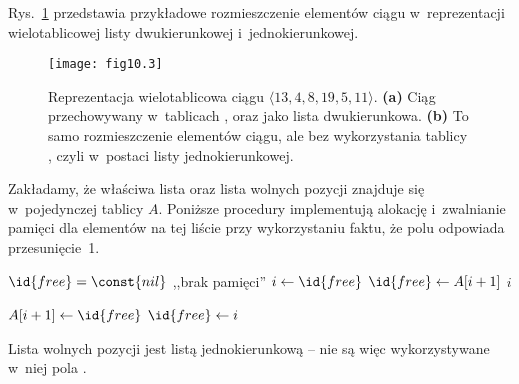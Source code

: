 
\exercise %
Rys.~\ref{fig:10.3-1} przedstawia przykładowe rozmieszczenie elementów ciągu w~reprezentacji wielotablicowej listy dwukierunkowej i~jednokierunkowej.
\begin{figure}[ht]
	\begin{center}
		\texttt{[image: fig10.3]}
	\end{center}
	\caption{Reprezentacja wielotablicowa ciągu $\langle13,4,8,19,5,11\rangle$. {\sffamily\bfseries(a)} Ciąg przechowywany w~tablicach ,  oraz  jako lista dwukierunkowa. {\sffamily\bfseries(b)} To samo rozmieszczenie elementów ciągu, ale bez wykorzystania tablicy , czyli w~postaci listy jednokierunkowej.} \label{fig:10.3-1}
\end{figure}

\exercise %
Zakładamy, że właściwa lista oraz lista wolnych pozycji znajduje się w~pojedynczej tablicy $A$. Poniższe procedury implementują alokację i~zwalnianie pamięci dla elementów na tej liście przy wykorzystaniu faktu, że polu  odpowiada przesunięcie~1.
\begin{codebox}
\li	\If $\id{free}=\const{nil}$
\li		\Then \Error ,,brak pamięci''
		\End
\li	$i\gets\id{free}$
\li	$\id{free}\gets A[i+1]$
\li	\Return $i$
\end{codebox}

\begin{codebox}
\li	$A[i+1]\gets\id{free}$
\li	$\id{free}\gets i$
\end{codebox}

\exercise %
Lista wolnych pozycji jest listą jednokierunkową -- nie są więc wykorzystywane w~niej pola .

\exercise %
% 

\exercise %
% 

